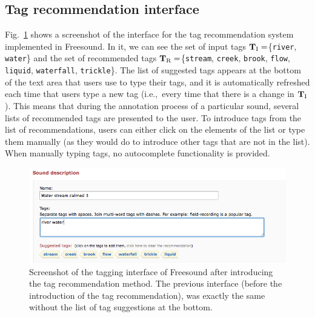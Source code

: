 
\subsection{Tag recommendation interface}
\label{impact:sec:tag_rec_interface}

Fig.~\ref{impact:fig:screenshot_system} shows a screenshot of the interface for the tag recommendation system implemented in Freesound. In it, we can see the set of input tags $\mathbf{T}_{\text{I}}=$\{\texttt{river}, \texttt{water}\} and the set of recommended tags $\mathbf{T}_{\text{R}}=$\{\texttt{stream}, \texttt{creek}, \texttt{brook}, \texttt{flow}, \texttt{liquid}, \texttt{waterfall}, \texttt{trickle}\}. The list of suggested tags appears at the bottom of the text area that users use to type their tags, and it is automatically refreshed each time that users type a new tag (i.e.,~every time that there is a change in $\mathbf{T}_{\text{I}}$). 
This means that during the annotation process of a particular sound, several lists of recommended tags are presented to the user. To introduce tags from the list of recommendations, users can either click on the elements of the list or type them manually (as they would do to introduce other tags that are not in the list). When manually typing tags, no autocomplete functionality is provided. 

\begin{figure}
\centerline{\includegraphics[width=1.0\columnwidth]{ch05_impact/pics/fig02_screenshot_system}}
\caption[Screenshot of the tagging interface of Freesound]{Screenshot of the tagging interface of Freesound after introducing the tag recommendation method. The previous interface (before the introduction of the tag recommendation), was exactly the same without the list of tag suggestions at the bottom.} 
\label{impact:fig:screenshot_system}
\end{figure}


